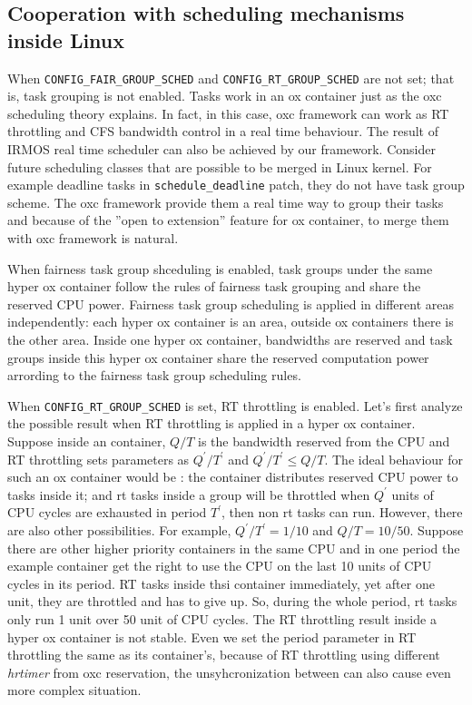 \subsection{Cooperation with scheduling mechanisms inside Linux}
When \texttt{CONFIG\_FAIR\_GROUP\_SCHED} and \texttt{CONFIG\_RT\_GROUP\_SCHED}
are not set; that is, task grouping is not enabled. Tasks work in an ox container
just as the oxc scheduling theory explains. In fact, in this case, oxc framework
can work as RT throttling and CFS bandwidth control in a real time behaviour.
The result of IRMOS real time scheduler can also be achieved by our framework.
Consider future scheduling classes that are possible to be merged in Linux kernel.
For example deadline tasks in \texttt{schedule\_deadline} patch, they do not
have task group scheme. The oxc framework provide them a real time way to group
their tasks and because of the ''open to extension'' feature for ox container, to
merge them with oxc framework is natural.

When fairness task group shceduling is enabled, task groups under the same 
hyper ox container follow the rules of fairness task grouping and share the 
reserved CPU power. Fairness task group scheduling is applied in different 
areas independently: each hyper ox container is an area, outside ox containers
there is the other area. Inside one hyper ox container, bandwidths are reserved
and task groups inside this hyper ox container share the reserved computation
power arrording to the fairness task group scheduling rules. 

When \texttt{CONFIG\_RT\_GROUP\_SCHED} is set, RT throttling is enabled.
Let's first analyze the possible result when RT throttling is applied in
a hyper ox container. Suppose inside an container, $Q/T$ is the 
bandwidth reserved from the CPU and RT throttling sets parameters as 
$Q^{'}/T^{'}$ and $Q^{'}/T^{'} \le Q/T$. The ideal behaviour for such an
ox container would be : the container distributes reserved CPU power 
to tasks inside it; and rt tasks inside a group will be throttled when
$Q^{'}$ units of CPU cycles are exhausted in period $T^{'}$, then non
rt tasks can run. However, there are also other possibilities.
For example, $Q^{'}/T^{'} = 1/10$ and $Q/T = 10/50$. Suppose there
are other higher priority containers in the same CPU and in one period 
the example container get the right to use the CPU on the last 10 units
of CPU cycles in its period. RT tasks inside thsi container immediately,
yet after one unit, they are throttled and has to give up. So, during the
whole period, rt tasks only run 1 unit over 50 unit of CPU cycles. The RT
throttling result inside a hyper ox container is not stable. 
Even we set the period parameter in RT throttling the same as its 
container's, because of RT throttling using different \emph{hrtimer} 
from oxc reservation, the unsyhcronization between can also cause even more 
complex situation.

